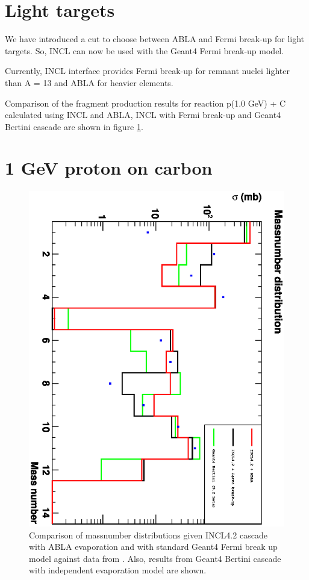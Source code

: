 \documentclass[a4paper]{jpconf}
\begin{document}
\section{Light targets}

We have introduced a cut to choose between ABLA and Fermi break-up for light targets.
So, INCL can now be used with the Geant4 Fermi break-up model.


Currently, INCL interface provides Fermi break-up \cite{g4incl} for
remnant nuclei lighter than A = 13 and ABLA for heavier elements.

Comparison of the fragment production results for reaction p(1.0 GeV)
+ C calculated using INCL and ABLA, INCL with Fermi break-up and
Geant4 Bertini cascade are shown in figure \ref{fig:fermibreakup}.

\section{1 GeV proton  on carbon}
\begin{figure}
\includegraphics[scale=0.60,angle=90]{poster/images/masses.eps}
\caption{Comparison of massnumber distributions given INCL4.2 cascade with ABLA evaporation 
and with standard Geant4 Fermi break up model against data from \cite{a}.
Also, results from Geant4 Bertini cascade with independent evaporation model are shown. }
\label{fig:fermibreakup}
\end{figure}
\end{document}

